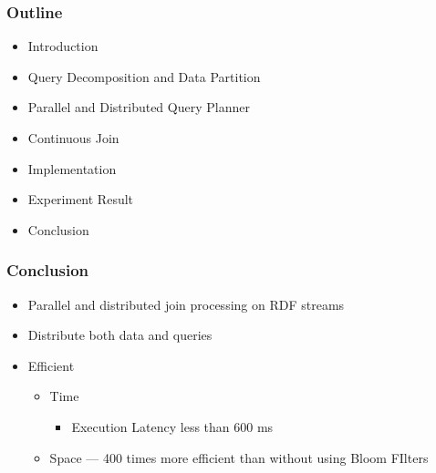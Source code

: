 \begin{frame}
\frametitle{Outline}
	\begin{itemize}
		\item Introduction
		\item Query Decomposition and Data Partition
		\item Parallel and Distributed Query Planner
		\item Continuous Join
		\item Implementation
		\item Experiment Result
		\item Conclusion
	\end{itemize}
\end{frame}

\begin{frame}
\frametitle{Conclusion}
\begin{itemize}
\item Parallel and distributed join processing on RDF streams
\item Distribute both data and queries
\item Efficient
\begin{itemize}
\item Time 
\begin{itemize}
\item Execution Latency less than 600 ms
\end{itemize}
\item Space --- 400 times more efficient than without using Bloom FIlters
\end{itemize}
\end{itemize}
\end{frame}

